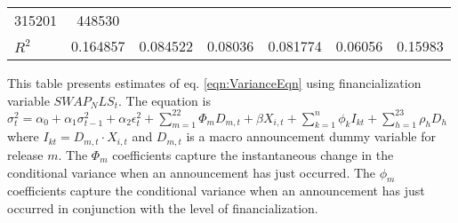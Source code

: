 \begin{sidewaystable}
{\begin{tabular}{@{}lllllllllllll@{}}
315201 }                                                   & \multicolumn{2}{c}{ 448530 }                                                 \\ \textbf{$R^2$}             &\multicolumn{2}{c}{ 0.164857 }                                                 & \multicolumn{2}{c}{ 0.084522 }                                                 & \multicolumn{2}{c}{ 0.08036 }                                                 & \multicolumn{2}{c}{ 0.081774 }                                                 & \multicolumn{2}{c}{ 0.06056 }                                                   & \multicolumn{2}{c}{ 0.15983 }                                                 \\ \bottomrule 
\end{tabular}
}
\begin{tablenotes}\item 
        \singlespacing
        \footnotesize
        This table presents estimates of eq. \ref{eqn:VarianceEqn} using financialization variable $SWAP_NLS_t$. The equation is $\sigma_{t}^2=\alpha_0+\alpha_1 \sigma_{t-1}^2+\alpha_2 \epsilon_t^2 +\sum_{m=1}^{22} \Phi_m D_{m,t}+\beta X_{i,t}+\sum_{k=1}^n \phi_k I_{kt} + \sum_{h=1}^{23} \rho_h D_h$ where $I_{kt}=D_{m,t} \cdot X_{i,t}$ and $D_{m,t}$ is a macro announcement dummy variable for release $m$. The $\Phi_m$ coefficients capture the instantaneous change in the conditional variance when an announcement has just occurred. The $\phi_m$ coefficients capture the conditional variance when an announcement has just occurred in conjunction with the level of financialization.
\end{tablenotes}
\end{sidewaystable}


